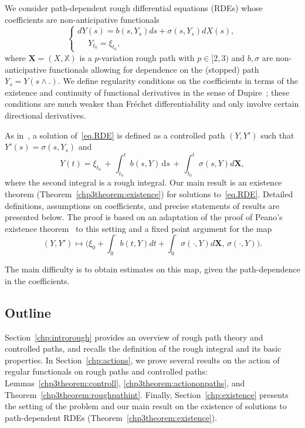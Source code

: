 \documentclass[AHL,Unicode,longabstracts,published]{cedram}
\renewcommand*\d{\mathrm{d}}
\newcommand{\bbX}{\mathbb{X}}
\begin{document}
We consider path-dependent rough differential equations (RDEs) whose coefficients are non-anticipative functionals
\begin{equation}\label{eq.RDE}
\begin{cases}
dY(s)= b(s, Y_s)ds+\sigma(s,Y_s)dX (s),
\\
\quad\; Y_{t_0}=\xi_{t_0},
\end{cases}
\end{equation}
where $\bm{X}=(X,\bbX)$ is a $p$-variation rough path with $p\in[2,3)$ and $b,\sigma$ are non-anticipative functionals allowing for dependence on the (stopped) path $Y_s=Y(s\wedge.)$. We define regularity conditions on the coefficients in terms of the existence and continuity of functional derivatives in the sense of Dupire~\cite{cont2012, D09}; these conditions are much weaker than Fréchet differentiability and only involve certain directional derivatives.

As in~\cite{frizhairer}, a solution of~\eqref{eq.RDE} is defined as a controlled path $(Y, Y')$ such that $Y'(s)=\sigma(s,Y_s)$ and
\[
Y(t)=\xi_{t_0}\,+\, \int_{t_0}^t b(s, Y)\, \d s\,+\,\int_{t_0}^t \sigma(s, Y) d\bm{X},
\]
where the second integral is a rough integral. Our main result is an existence theorem (Theorem~\ref{chp3theorem:existence}) for solutions to~\eqref{eq.RDE}. Detailed definitions, assumptions on coefficients, and precise statements of results are presented below. The proof is based on an adaptation of the proof of Peano's existence theorem~\cite{peano} to this setting and a fixed point argument for the map
\[
\left(Y, Y'\right)\mapsto \Big(\xi_0+\int_0^{\cdot} b(t, Y)dt+\int_0^{\cdot} \sigma(\cdot, Y) d\bm{X},\, \sigma(\cdot, Y) \Big).
\]

The main difficulty is to obtain estimates on this map, given the path-dependence in the coefficients.

\subsection*{Outline} 
Section~\ref{chp:introrough} provides an overview of rough path theory and controlled paths, and recalls the definition of the rough integral and its basic properties. In Section~\ref{chp:actions}, we prove several results on the action of regular functionals on rough paths and controlled paths: Lemmas~\ref{chp3theorem:controll}, \ref{chp3theorem:actiononpaths}, and Theorem~\ref{chp3theorem:roughpathint}. Finally, Section~\ref{chp:existence} presents the setting of the problem and our main result on the existence of solutions to path-dependent RDEs (Theorem~\ref{chp3theorem:existence}).
\end{document}
